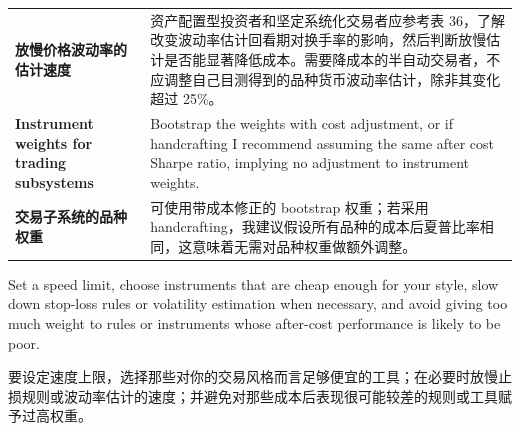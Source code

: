 \begin{bilingualtableblock}
{\begin{tabularx}{\textwidth}{@{} p{} Y@{}}
\textbf{放慢价格波动率的估计速度} & 资产配置型投资者和坚定系统化交易者应参考表 36，了解改变波动率估计回看期对换手率的影响，然后判断放慢估计是否能显著降低成本。需要降成本的半自动交易者，不应调整自己目测得到的品种货币波动率估计，除非其变化超过 25\%。 \\
\textbf{Instrument weights for trading subsystems} & Bootstrap the weights with cost adjustment, or if handcrafting I recommend assuming the same after cost Sharpe ratio, implying no adjustment to instrument weights. \\
\textbf{交易子系统的品种权重} & 可使用带成本修正的 bootstrap 权重；若采用 handcrafting，我建议假设所有品种的成本后夏普比率相同，这意味着无需对品种权重做额外调整。 \\
\end{tabularx}
}
\end{bilingualtableblock}

\begin{englishblock} Set a speed limit, choose instruments that are cheap enough for your style, slow down stop-loss rules or volatility estimation when necessary, and avoid giving too much weight to rules or instruments whose after-cost performance is likely to be poor. \end{englishblock}

\begin{chineseblock}要设定速度上限，选择那些对你的交易风格而言足够便宜的工具；在必要时放慢止损规则或波动率估计的速度；并避免对那些成本后表现很可能较差的规则或工具赋予过高权重。\end{chineseblock}


\begin{bilingualtableblock} 
\end{bilingualtableblock}


